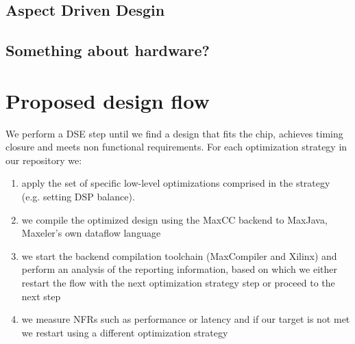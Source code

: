\subsection{Aspect Driven Desgin}

\subsection{Something about hardware?}

\section{Proposed design flow}

We perform a DSE step until we find a design that fits the chip,
achieves timing closure and meets non functional requirements.  For
each optimization strategy in our repository we:

\begin{enumerate}

\item apply the set of specific low-level optimizations comprised in
  the strategy (e.g. setting DSP balance).

\item  we compile the optimized
  design using the MaxCC backend to MaxJava, Maxeler's own dataflow
  language

\item we start the backend compilation toolchain (MaxCompiler
  and Xilinx) and perform an analysis of the reporting information,
  based on which we either restart the flow with the next optimization
  strategy step or proceed to the next step

\item we measure NFRs such as performance or latency and if our target
  is not met we restart using a different optimization strategy

\end{enumerate}

